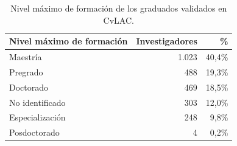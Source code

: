 \begin{table}[H]\centering\footnotesize
\caption{Nivel máximo de formación de los graduados validados en CvLAC.}\label{tab:cvlac_nivel}
\begin{tabular}{lrr}
\toprule
\rowcolor{ustaazul}\textbf{\color{white}Nivel máximo de formación} & \textbf{\color{white}Investigadores} & \textbf{\color{white}\%} \\
\midrule
Maestría & 1.023 & 40,4\% \\
Pregrado & 488 & 19,3\% \\
Doctorado & 469 & 18,5\% \\
No identificado & 303 & 12,0\% \\
Especialización & 248 & 9,8\% \\
Posdoctorado & 4 & 0,2\% \\
\bottomrule
\end{tabular}
\end{table}